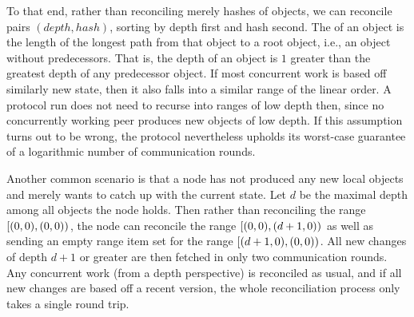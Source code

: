 To that end, rather than reconciling merely hashes of objects, we can reconcile pairs $(\mathit{depth}, \mathit{hash})$, sorting by depth first and hash second. The  of an object is the length of the longest path from that object to a root object, i.e., an object without predecessors. That is, the depth of an object is $1$ greater than the greatest depth of any predecessor object. If most concurrent work is based off similarly new state, then it also falls into a similar range of the linear order. A protocol run does not need to recurse into ranges of low depth then, since no concurrently working peer produces new objects of low depth. If this assumption turns out to be wrong, the protocol nevertheless upholds its worst-case guarantee of a logarithmic number of communication rounds.

Another common scenario is that a node has not produced any new local objects and merely wants to catch up with the current state. Let $d$ be the maximal depth among all objects the node holds. Then rather than reconciling the range $[{(0, 0)},{(0, 0)})_{}$, the node can reconcile the range $[{(0, 0)},{(d + 1, 0)})_{}$ as well as sending an empty range item set for the range $[{(d + 1, 0)},{(0, 0)})_{}$. All new changes of depth $d + 1$ or greater are then fetched in only two communication rounds. Any concurrent work (from a depth perspective) is reconciled as usual, and if all new changes are based off a recent version, the whole reconciliation process only takes a single round trip.

